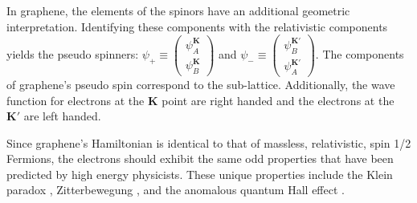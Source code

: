 In graphene, the elements of the spinors have an additional geometric interpretation.
Identifying these components with the relativistic components yields the pseudo spinners: $\psi_+ \equiv \left(\begin{array}{c} \psi_A^{\bm{K}} \\ \psi_B^{\bm{K}} \end{array} \right)$ and $\psi_- \equiv \left(\begin{array}{c} \psi_B^{\bm{K'}} \\ \psi_A^{\bm{K'}} \end{array} \right)$.
The components of graphene's pseudo spin correspond to the sub-lattice.
Additionally, the wave function for electrons at the $\bm{K}$ point are right handed and the electrons at the $\bm{K'}$ are left handed.

Since graphene's Hamiltonian is identical to that of massless, relativistic, spin 1/2 Fermions, the electrons should exhibit the same odd properties that have been predicted by high energy physicists.
These unique properties include the Klein paradox \cite{Young2009}, Zitterbewegung \cite{CastroNeto2009}, and the anomalous quantum Hall effect \cite{Novoselov2005a,Zhang2005}.
